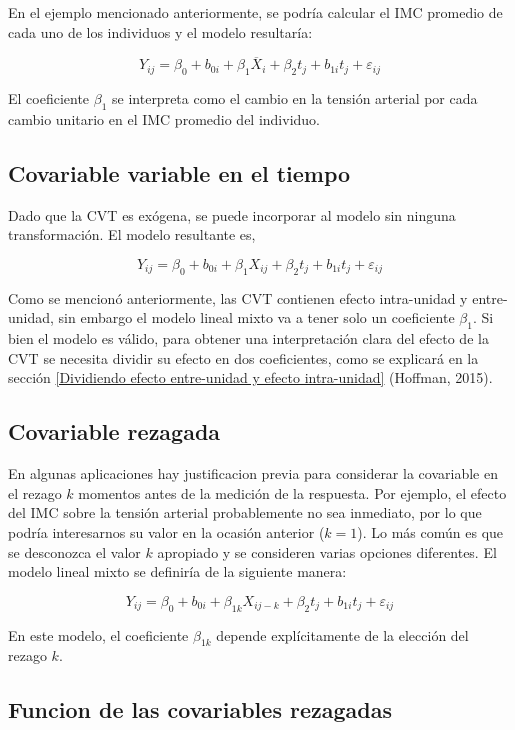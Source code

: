 \documentclass[spanish]{article}
\numberwithin{figure}{subsection}
\numberwithin{equation}{subsection}
\numberwithin{table}{subsection}
\begin{document}
En el ejemplo mencionado anteriormente, se podría calcular el IMC promedio de
cada uno de los individuos y el modelo resultaría:

\[ Y_{ij} = \beta_0 + b_{0i} + \beta_1 \overline{X}_i + \beta_2 t_j + b_{1i} t_j + \varepsilon_{ij} \]

El coeficiente $\beta_1$ se interpreta como el cambio en la tensión arterial por
cada cambio unitario en el IMC promedio del individuo.

\subsection{Covariable variable en el tiempo}

Dado que la CVT es exógena, se puede incorporar al modelo sin ninguna
transformación. El modelo resultante es,

\[ Y_{ij} = \beta_0 + b_{0i} + \beta_1 X_{ij} + \beta_2 t_j + b_{1i} t_j + \varepsilon_{ij} \]

Como se mencionó anteriormente, las CVT contienen efecto intra-unidad y
entre-unidad, sin embargo el modelo lineal mixto va a tener solo un coeficiente
$\beta_1$. Si bien el modelo es válido, para obtener una interpretación clara
del efecto de la CVT se necesita dividir su efecto en dos coeficientes, como se
explicará en la sección \ref{Dividiendo efecto entre-unidad y efecto
intra-unidad} (Hoffman, 2015).


\subsection{Covariable rezagada}

En algunas aplicaciones hay justificacion previa para considerar la covariable
en el rezago $k$ momentos antes de la medición de la respuesta. Por ejemplo, el
efecto del IMC sobre la tensión arterial probablemente no sea inmediato, por lo
que podría interesarnos su valor en la ocasión anterior ($k=1$). Lo más común es
que se desconozca el valor $k$ apropiado y se consideren varias opciones
diferentes. El modelo lineal mixto se definiría de la siguiente manera:

\[ Y_{ij} = \beta_0 + b_{0i} + \beta_{1k} X_{ij-k} + \beta_2 t_j + b_{1i} t_j + \varepsilon_{ij} \]

En este modelo, el coeficiente $\beta_{1k}$ depende explícitamente de la
elección del rezago $k$.

\subsection{Funcion de las covariables rezagadas}
\end{document}
